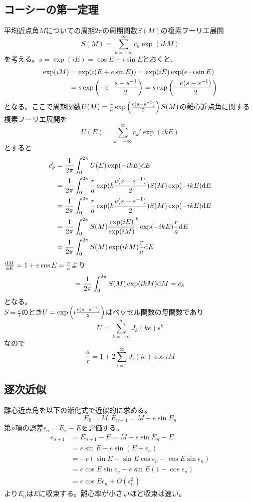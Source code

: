 	\subsection{コーシーの第一定理}
		平均近点角$M$についての周期$2\pi$の周期関数$S(M)$の複素フーリエ展開
			\[S(M) = \sum_{k=-\infty}^{\infty} c_k \exp(ikM)\]
		を考える。$s = \exp(iE) = \cos E + i\sin E$とおくと、
		\begin{align*}
			\exp(iM) &= \exp(i(E + e\sin E)) = \exp(iE)\exp(e \cdot i\sin E)\\
			&= s\exp\lr{- e \cdot \frac{s - s^{-1}}{2}} = s\exp\lr{- \frac{e(s - s^{-1})}{2}}\\
		\end{align*}
		となる。ここで周期関数$U(M) = \frac{r}{a}\exp\lr{\frac{e(s - s^{-1})}{2}}S(M)$の離心近点角に関する複素フーリエ展開を
			\[U(E) = \sum_{k=-\infty}^{\infty} c_k' \exp(ikE)\]
		とすると
		\begin{align*}
			c_k' 
            &= \frac{1}{2\pi}\int_0^{2\pi} U(E)\exp(-ikE) \d E\\
			&= \frac{1}{2\pi}\int_0^{2\pi} \frac{r}{a}\exp(k\frac{e(s - s^{-1})}{2})S(M)\exp(-ikE) \d E\\
			&= \frac{1}{2\pi}\int_0^{2\pi} \frac{r}{a}\exp(k\frac{e(s - s^{-1})}{2})S(M)\exp(-ikE) \d E\\
			&= \frac{1}{2\pi}\int_0^{2\pi} S(M)\frac{\exp(iE)}{\exp(iM)}^k\exp(-ikE) \frac{r}{a}\d E\\
			&= \frac{1}{2\pi}\int_0^{2\pi} S(M)\exp(ikM) \frac{r}{a}\d E\\
		\end{align*}
		$\de[M]{E} = 1 + e\cos E = \frac{r}{a}$より
		\begin{align*}
			= \frac{1}{2\pi}\int_0^{2\pi} S(M)\exp(ikM) \d M = c_k
		\end{align*}
		となる。\\
		$S = \frac{a}{r}$のとき$U = \exp\lr{i\frac{e(s - s^{-1})}{2}}$はベッセル関数の母関数であり
			\[U = \sum_{k=-\infty}^{\infty} J_k(ke)s^k\]
		なので
			\[\frac{a}{r} = 1 + 2\sum_{i=1}^{\infty}J_i(ie)\cos iM\]
	\subsection{逐次近似}
		離心近点角を以下の漸化式で近似的に求める。
			\[E_0 = M, E_{n+1} = M - e\sin E_n\]
		第$n$項の誤差$\epsilon_n = E_n - E$を評価する。
		\begin{align*}
			\epsilon_{n+1}
            &= E_{n+1} - E = M - e\sin E_n - E\\
			&= e\sin E - e\sin(E + \epsilon_n)\\
			&= - e(\sin E - \sin E\cos \epsilon_n - \cos E\sin \epsilon_n)\\
			&= e\cos E\sin\epsilon_n - e\sin E(1 - \cos\epsilon_n)\\
			&= e\cos E\epsilon_n + O(\epsilon_n^2)
		\end{align*}
		より$E_n$は$E$に収束する。離心率が小さいほど収束は速い。
